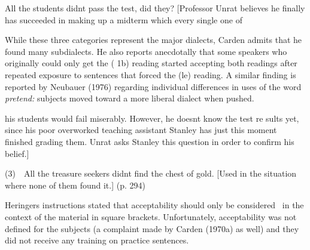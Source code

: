 \setcounter{listWWNumxliileveli}{1}
\begin{listWWNumxliileveli}
\item 
\begin{styleTextbody}
All the students didn{\textquotesingle}t pass the test, did they? [Professor Unrat believes he finally has succeeded in making up a midterm which every single one of
\end{styleTextbody}


\setcounter{listWWNumxliilevelii}{0}
\begin{listWWNumxliilevelii}
\item 
\begin{styleStandard}
While these three categories represent the major dialects, Carden admits that he found many subdialects. He also reports anecdotally that some speakers who originally could only get the ( 1b) reading started accepting both readings after repeated exposure to sentences that forced the (le) reading. A similar finding is reported by Neubauer (1976) regarding individual differences in uses of the word \textit{pretend:}\textit{ }subjects moved toward a more liberal dialect when pushed.
\end{styleStandard}


\end{listWWNumxliilevelii}
\end{listWWNumxliileveli}
\clearpage\setcounter{page}{1}\begin{styleStandard}
his students would fail miserably. However, he doesn{\textquotesingle}t know the test re\- sults yet, since his poor overworked teaching assistant Stanley has just this moment finished grading them. Unrat asks Stanley this question in order to confirm his belief.]
\end{styleStandard}


\begin{styleStandard}
(3)\ \ All the treasure seekers didn{\textquotesingle}t find the chest of gold. [Used in the situation where none of them found it.] (p. 294)
\end{styleStandard}


\begin{styleStandard}
Heringer{\textquotesingle}s instructions stated that acceptability should only be considered \ in the context of the material in square brackets. Unfortunately, acceptability was not defined for the subjects (a complaint made by Carden (1970a) as well) and they did not receive any training on practice sentences.
\end{styleStandard}


